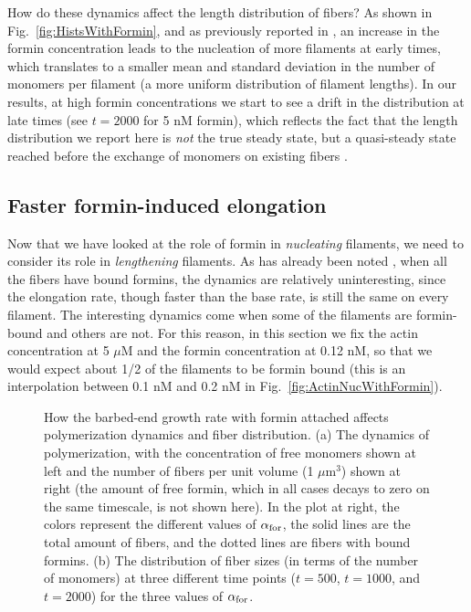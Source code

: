 \documentclass[11pt]{article}
\begin{document}
How do these dynamics affect the length distribution of fibers? As shown in Fig.\ \ref{fig:HistsWithFormin}, and as previously reported in \cite{banerjee2022emergence}, an increase in the formin concentration leads to the nucleation of more filaments at early times, which translates to a smaller mean and standard deviation in the number of monomers per filament (a more uniform distribution of filament lengths). In our results, at high formin concentrations we start to see a drift in the distribution at late times (see $t=2000$ for 5 nM formin), which reflects the fact that the length distribution we report here is \emph{not} the true steady state, but a quasi-steady state reached before the exchange of monomers on existing fibers \cite{mohapatra2017limiting}.

\subsection{Faster formin-induced elongation}
Now that we have looked at the role of formin in \emph{nucleating} filaments, we need to consider its role in \emph{lengthening} filaments. As has already been noted \cite{banerjee2022emergence}, when all the fibers have bound formins, the dynamics are relatively uninteresting, since the elongation rate, though faster than the base rate, is still the same on every filament. The interesting dynamics come when some of the filaments are formin-bound and others are not. For this reason, in this section we fix the actin concentration at 5 $\mu$M and the formin concentration at 0.12 nM, so that we would expect about 1/2 of the filaments to be formin bound (this is an interpolation between 0.1 nM and 0.2 nM in Fig.\ \ref{fig:ActinNucWithFormin}). 

\begin{figure}
\centering
{}
\caption{\label{fig:ForminAlpha}How the barbed-end growth rate with formin attached affects polymerization dynamics and fiber distribution. (a) The dynamics of polymerization, with the concentration of free monomers shown at left and the number of fibers per unit volume (1 $\mu$m$^3$) shown at right (the amount of free formin, which in all cases decays to zero on the same timescale, is not shown here). In the plot at right, the colors represent the different values of $\alpha_\text{for}$, the solid lines are the total amount of fibers, and the dotted lines are fibers with bound formins. (b) The distribution of fiber sizes (in terms of the number of monomers) at three different time points ($t=500$, $t=1000$, and $t=2000$) for the three values of $\alpha_\text{for}$.}
\end{figure}
\end{document}
